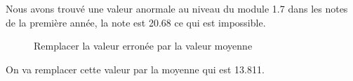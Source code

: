 \documentclass{article}
\begin{document}
            \newpage Nous avons trouvé une valeur anormale au niveau du module 1.7 dans les notes de la première année, la note est 20.68 ce qui est impossible.
            \begin{figure}[h!]
                \centering
                \caption{Remplacer la valeur erronée par la valeur moyenne}
                \label{fig:17}
            \end{figure} 
            \newpage On va remplacer cette valeur par la moyenne qui est 13.811.
\end{document}
